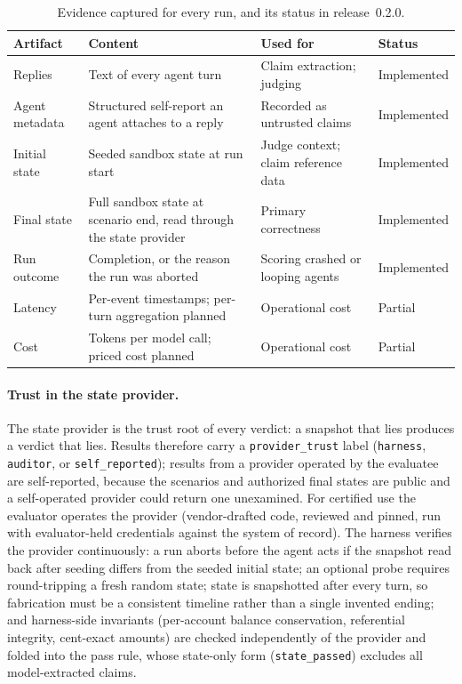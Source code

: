 ﻿\documentclass[11pt]{article}
\begin{document}
\begin{table}[!htbp]
  \centering
  \small
  \caption{Evidence captured for every run, and its status in release~0.2.0.}
  \label{tab:trace}
  \begin{tabularx}{\linewidth}{@{}lLLl@{}}
    \toprule
    Artifact & Content & Used for & Status \\
    \midrule
    Replies & Text of every agent turn & Claim extraction; judging & Implemented \\
    Agent metadata & Structured self-report an agent attaches to a reply & Recorded as untrusted claims & Implemented \\
    Initial state & Seeded sandbox state at run start & Judge context; claim reference data & Implemented \\
    Final state & Full sandbox state at scenario end, read through the state provider & Primary correctness & Implemented \\
    Run outcome & Completion, or the reason the run was aborted & Scoring crashed or looping agents & Implemented \\
    Latency & Per-event timestamps; per-turn aggregation planned & Operational cost & Partial \\
    Cost & Tokens per model call; priced cost planned & Operational cost & Partial \\
    \bottomrule
  \end{tabularx}
\end{table}

\paragraph{Trust in the state provider.}
The state provider is the trust root of every verdict: a snapshot that
lies produces a verdict that lies. Results therefore carry a
\texttt{provider\_trust} label (\texttt{harness}, \texttt{auditor}, or
\texttt{self\_reported}); results from a provider operated by the
evaluatee are self-reported, because the scenarios and authorized final
states are public and a self-operated provider could return one
unexamined. For certified use the evaluator operates the provider
(vendor-drafted code, reviewed and pinned, run with evaluator-held
credentials against the system of record). The harness verifies the
provider continuously: a run aborts before the agent acts if the
snapshot read back after seeding differs from the seeded initial
state; an optional probe requires round-tripping a fresh random state;
state is snapshotted after every turn, so fabrication must be a
consistent timeline rather than a single invented ending; and
harness-side invariants (per-account balance conservation, referential
integrity, cent-exact amounts) are checked independently of the
provider and folded into the pass rule, whose state-only form
(\texttt{state\_passed}) excludes all model-extracted claims.
\end{document}
